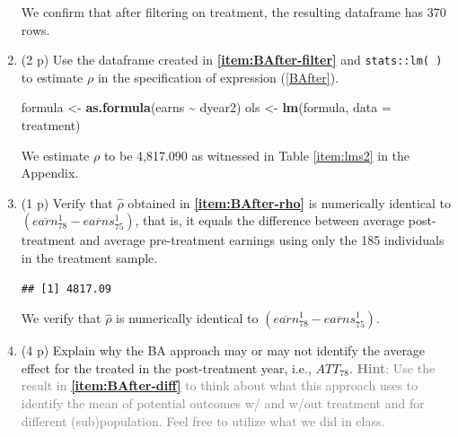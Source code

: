 \documentclass[
]{article}
\newenvironment{Shaded}{\begin{snugshade}}{\end{snugshade}}
\newcommand{\AttributeTok}[1]{\textcolor[rgb]{0.13,0.29,0.53}{#1}}
\newcommand{\DecValTok}[1]{\textcolor[rgb]{0.00,0.00,0.81}{#1}}
\newcommand{\FunctionTok}[1]{\textcolor[rgb]{0.13,0.29,0.53}{\textbf{#1}}}
\newcommand{\NormalTok}[1]{#1}
\newcommand{\OtherTok}[1]{\textcolor[rgb]{0.56,0.35,0.01}{#1}}
\newcommand{\SpecialCharTok}[1]{\textcolor[rgb]{0.81,0.36,0.00}{\textbf{#1}}}
\begin{document}
\begin{enumerate}
  We confirm that after filtering on treatment, the resulting dataframe
  has 370 rows.
\item
  (2 p) Use the dataframe created in \textbf{\ref{item:BAfter-filter}}
  and \texttt{stats::lm( )} to estimate \(\rho\) in the specification of
  expression (\ref{BAfter}).\label{item:BAfter-rho}

\begin{Shaded}
\begin{Highlighting}[]
\NormalTok{formula }\OtherTok{\textless{}{-}} \FunctionTok{as.formula}\NormalTok{(earns }\SpecialCharTok{\textasciitilde{}}\NormalTok{ dyear2)}
\NormalTok{ols }\OtherTok{\textless{}{-}} \FunctionTok{lm}\NormalTok{(formula, }\AttributeTok{data =}\NormalTok{ treatment)}
\end{Highlighting}
\end{Shaded}

  We estimate \(\rho\) to be 4,817.090 as witnessed in Table
  \ref{item:lms2} in the Appendix. \newpage 
\item
  (1 p) Verify that \(\hat{\rho}\) obtained in
  \textbf{\ref{item:BAfter-rho}} is numerically identical to
  \(\left( \overline{earn}_{78}^{1}-\overline{earns}_{75}^{1}\right)\),
  that is, it equals the difference between average post-treatment and
  average pre-treatment earnings using only the 185 individuals in the
  treatment sample.\label{item:BAfter-diff}

\begin{Shaded}
\end{Shaded}

\begin{verbatim}
## [1] 4817.09
\end{verbatim}

  We verify that \(\hat{\rho}\) is numerically identical to
  \(\left( \overline{earn}_{78}^{1}-\overline{earns}_{75}^{1}\right)\).
\item
  (4 p) Explain why the BA approach may or may not identify the average
  effect for the treated in the post-treatment year, i.e.,
  \({ATT}_{78}\).
  \textcolor{gray}{\textbf{Hint}: Use the result in \textbf{\ref{item:BAfter-diff}} to think about what this approach uses to identify the mean of potential outcomes w/ and w/out treatment and for different (sub)population. Feel free to utilize what we did in class.}


\end{enumerate}
\end{document}

